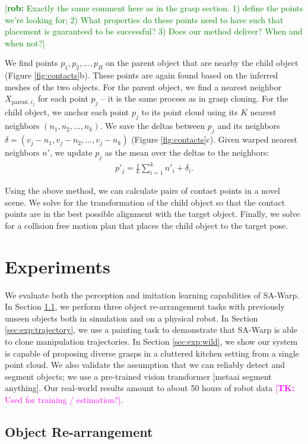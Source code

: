 \documentclass{article}
\newcommand{\rob}[1]{\textcolor{green}{[\textbf{rob:} #1]}}
\newcommand{\tk}[1]{\textcolor{magenta}{[\textbf{TK:} #1]}}
\begin{document}
\rob{Exactly the same comment here as in the grasp section. 1) define the points we're looking for; 2) What properties do these points need to have such that placement is guaranteed to be successful? 3) Does our method deliver? When and when not?}

We find points $p_1, p_2, ..., p_B$ on the parent object that are nearby the child object (Figure \ref{fig:contacts}b). These points are again found based on the inferred meshes of the two objects. For the parent object, we find a nearest neighbor $X_{\mathrm{parent},i_j}$ for each point $p_j$ -- it is the same process as in grasp cloning. For the child object, we anchor each point $p_j$ to its point cloud using its $K$ nearest neighbors $(n_1, n_2, ..., n_k)$. We save the deltas between $p_j$ and its neighbors $\delta = (v_j - n_1, v_j - n_2, ..., v_j - n_k)$ (Figure \ref{fig:contacts}c). Given warped nearest neighbors $n'$, we update $p_j$ as the mean over the deltas to the neighbors:
\begin{align}
    p'_j = \frac{1}{k} \sum_{i=1}^k n'_i + \delta_i.
\end{align}

Using the above method, we can calculate pairs of contact points in a novel scene. We solve for the transformation of the child object so that the contact points are in the best possible alignment with the target object. Finally, we solve for a collision free motion plan that places the child object to the target pose.

\section{Experiments}
\label{sec:exp}

We evaluate both the perception and imitation learning capabilities of SA-Warp. In Section \ref{sec:exp:rearrangement}, we perform three object re-arrangement tasks with previously unseen objects both in simulation and on a physical robot. In Section \ref{sec:exp:trajectory}, we use a painting task to demonstrate that SA-Warp is able to clone manipulation trajectories. In Section \ref{sec:exp:wild}, we show our system is capable of proposing diverse grasps in a cluttered kitchen setting from a single point cloud. We also validate the assumption that we can reliably detect and segment objects; we use a pre-trained vision transformer [metaai segment anything]. Our real-world results amount to about 50 hours of robot data \tk{Used for training / estimation?}.

\subsection{Object Re-arrangement}
\label{sec:exp:rearrangement}
\end{document}
